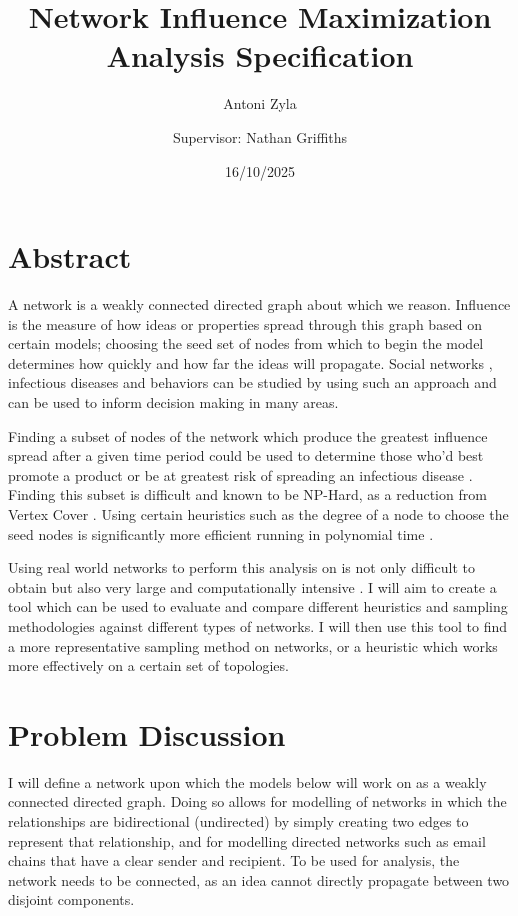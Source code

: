 \documentclass{article}
\title{\textbf{Network Influence Maximization Analysis Specification}}
\author{Antoni Zyla \and Supervisor: Nathan Griffiths}
\date{16/10/2025}
\begin{document}
\maketitle
\linespread{1.25}

\section{Abstract}

A network is a weakly connected directed graph about which we reason.
Influence is the measure of how ideas or properties spread through this graph based on certain models;
choosing the seed set of nodes from which to begin the model determines how quickly and how far the ideas will propagate.
Social networks \cite{yang2019influence}, infectious diseases and behaviors \cite{archbold2024cvd} can be studied by using such an approach and can be used to inform decision making in many areas.

Finding a subset of nodes of the network which produce the greatest influence spread after a given time period could be used to determine those who'd best promote a product or be at greatest risk of spreading an infectious disease \cite{archbold2024cvd}.
Finding this subset is difficult and known to be NP-Hard, as a reduction from Vertex Cover \cite{kempe2005influential}.
Using certain heuristics such as the degree of a node to choose the seed nodes is significantly more efficient running in polynomial time \cite{chen2009efficient}.

Using real world networks to perform this analysis on is not only difficult to obtain but also very large and computationally intensive \cite{Wang2011UnderstandingGS}.
I will aim to create a tool which can be used to evaluate and compare different heuristics and sampling methodologies against different types of networks.
I will then use this tool to find a more representative sampling method on networks, or a heuristic which works more effectively on a certain set of topologies.

\section{Problem Discussion}

I will define a network upon which the models below will work on as a weakly connected directed graph.
Doing so allows for modelling of networks in which the relationships are bidirectional (undirected) by simply creating two edges to represent that relationship, and for modelling directed networks such as email chains that have a clear sender and recipient.
To be used for analysis, the network needs to be connected, as an idea cannot directly propagate between two disjoint components.
\end{document}
